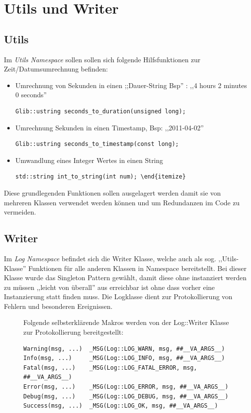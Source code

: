 
\section{Utils und Writer} 

\subsection{Utils}
Im \emph{Utils Namespace} sollen sollen sich folgende Hilfsfunktionen zur Zeit/Datumsumrechnung befinden:

\begin{itemize}
\item Umrechnung von Sekunden in einen ;;Dauer-String Bsp'' : ,,4 hours 2 minutes 0 seconds''

\begin{verbatim}
Glib::ustring seconds_to_duration(unsigned long);
\end{verbatim}

\item Umrechnung Sekunden in einen Timestamp, Bsp: ,,2011-04-02''
\begin{verbatim}
Glib::ustring seconds_to_timestamp(const long);
\end{verbatim}

\item Umwandlung eines Integer Wertes in einen String
\begin{verbatim}
std::string int_to_string(int num); \end{itemize}
\end{verbatim}
\end{itemize}


Diese grundlegenden Funktionen sollen ausgelagert werden damit sie von mehreren Klassen verwendet werden können und um Redundanzen im 
Code zu vermeiden.

\subsection{Writer}

Im \emph{Log Namespace} befindet sich die Writer Klasse, welche auch als sog. ,,Utils-Klasse'' Funktionen für alle anderen
Klassen in Namespace bereitstellt. Bei dieser Klasse wurde das Singleton Pattern gewählt, damit diese ohne instanziert werden
zu müssen ,,leicht von überall'' aus erreichbar ist ohne dass vorher eine Instanzierung statt finden muss.
Die Logklasse dient zur Protokollierung von Fehlern und besonderen Ereignissen.  

\begin{figure}[htb!]
Folgende selbsterklärende Makros werden von der Log::Writer Klasse zur Protokollierung bereitgestellt:

\begin{verbatim}
Warning(msg, ...)  _MSG(Log::LOG_WARN, msg, ##__VA_ARGS__)
Info(msg, ...)     _MSG(Log::LOG_INFO, msg, ##__VA_ARGS__)
Fatal(msg, ...)    _MSG(Log::LOG_FATAL_ERROR, msg, ##__VA_ARGS__)
Error(msg, ...)    _MSG(Log::LOG_ERROR, msg, ##__VA_ARGS__)
Debug(msg, ...)    _MSG(Log::LOG_DEBUG, msg, ##__VA_ARGS__)
Success(msg, ...)  _MSG(Log::LOG_OK, msg, ##__VA_ARGS__)
\end{verbatim}
\end{figure}

